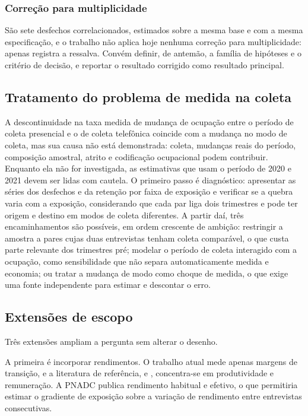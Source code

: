\subsubsection{Correção para multiplicidade}

São sete desfechos correlacionados, estimados sobre a mesma base e com a mesma
especificação, e o trabalho não aplica hoje nenhuma correção para multiplicidade:
apenas registra a ressalva. Convém definir, de antemão, a família de
hipóteses e o critério de decisão, e reportar o resultado corrigido como
resultado principal.

\subsection{Tratamento do problema de medida na coleta}

A descontinuidade na taxa medida de mudança de ocupação entre o período de
coleta presencial e o de coleta telefônica coincide com a mudança no modo de
coleta, mas sua causa não está demonstrada: coleta, mudanças reais do período,
composição amostral, atrito e codificação ocupacional podem contribuir.
Enquanto ela não for investigada, as estimativas que usam o período de 2020 e
2021 devem ser lidas com cautela. O primeiro passo é diagnóstico: apresentar as
séries dos desfechos e da retenção por faixa de exposição e verificar se a
quebra varia com a exposição, considerando que cada par liga dois trimestres e
pode ter origem e destino em modos de coleta diferentes. A partir daí, três
encaminhamentos são possíveis, em ordem crescente de ambição: restringir a
amostra a pares cujas duas entrevistas tenham coleta comparável, o que custa
parte relevante dos trimestres pré; modelar o período de coleta interagido com
a ocupação, como sensibilidade que não separa automaticamente medida e
economia; ou tratar a mudança de modo como choque de medida, o que exige uma
fonte independente para estimar e descontar o erro.

\subsection{Extensões de escopo}

Três extensões ampliam a pergunta sem alterar o desenho.

A primeira é incorporar rendimentos. O trabalho atual mede apenas margens de
transição, e a literatura de referência,  e
, concentra-se em produtividade e remuneração. A PNADC
publica rendimento habitual e efetivo, o que permitiria estimar o gradiente de
exposição sobre a variação de rendimento entre entrevistas consecutivas.

